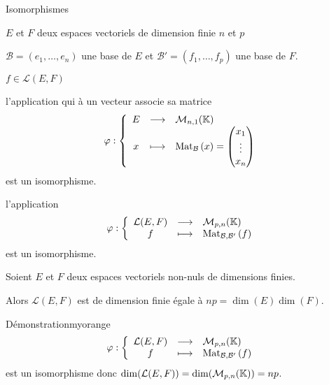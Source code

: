     \begin{theo}{Isomorphismes}{}
        \begin{soient}
            \item $E$ et $F$ deux espaces vectoriels de dimension finie $n$ et $p$
            \item $\mathcal{B} = (e_1, \ldots, e_n)$ une base de $E$ et $\mathcal{B}' = (f_1,\ldots,f_p)$ une base de $F$.
            \item $f \in \mathcal{L}(E,F)$
        \end{soient}
        \begin{alors}
            \item l’application qui à un vecteur associe sa matrice \[ \fonction{\varphi}{E}{\mk{n,1}}{x}{\mat{\mathcal{B}}{x} = \begin{pmatrix}
                x_1 \\
                \vdots \\
                x_n
            \end{pmatrix}} \] est un isomorphisme.
            \item l’application \[ \fonction{\varphi}{\mathcal{L}(E,F)}{\mk{p,n}}{f}{\mat{\mathcal{B},\mathcal{B}'}{f}} \] est un isomorphisme.
        \end{alors}
    \end{theo}

    \begin{coro}{}{}
        Soient $E$ et $F$ deux espaces vectoriels non-nuls de dimensions finies.

        Alors $\mathcal{L}(E,F)$ est de dimension finie égale à $np = \dim(E)\dim(F)$.
    \end{coro}

    \begin{demo}{Démonstration}{myorange}
         \[ \fonction{\varphi}{\mathcal{L}(E,F)}{\mk{p,n}}{f}{\mat{\mathcal{B},\mathcal{B}'}{f}} \] est un isomorphisme donc $\dim(\mathcal{L}(E,F)) = \dim(\mathcal{M}_{p,n}(\mathbb{K})) = np$.
    \end{demo}

